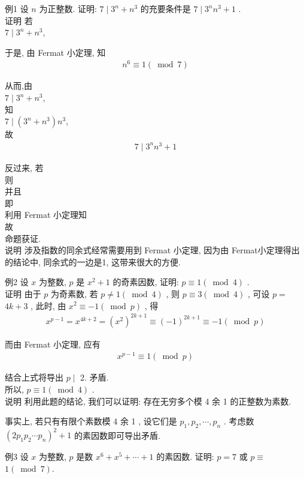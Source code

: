 	例1 设 $n$ 为正整数. 证明: $7 \mid 3^{n}+n^{3}$ 的充要条件是 $7 \mid 3^{n} n^{3}+1$ . \\
	证明 若\\
$7 \mid 3^{n}+n^{3}$,

	于是, 由 Fermat 小定理, 知
	\begin{align*}
		n^{6} \equiv 1(\bmod 7)
	\end{align*}

	从而,由\\
$7 \mid 3^{n}+n^{3}$,\\
	知\\
$7 \mid\left(3^{n}+n^{3}\right) n^{3}$,\\
	故
	\begin{align*}
		7 \mid 3^{n} n^{3}+1
	\end{align*}

	反过来, 若\\
	则\\
	并且\\
	即\\
	利用 Fermat 小定理知\\
	故\\
	命题获证.\\
	说明 涉及指数的同余式经常需要用到 Fermat 小定理, 因为由 Fermat小定理得出的结论中, 同余式的一边是1, 这带来很大的方便.

	例2 设 $x$ 为整数,  $p$ 是 $x^{2}+1$ 的奇素因数, 证明:  $p \equiv 1(\bmod 4)$ . \\
	证明 由于 $p$ 为奇素数, 若 $p \neq 1(\bmod 4)$ , 则 $p \equiv 3(\bmod 4)$ , 可设 $p=$ $4 k+3$ , 此时, 由 $x^{2} \equiv-1(\bmod p)$ , 得
	\begin{align*}
		x^{p-1}=x^{4 k+2}=\left(x^{2}\right)^{2 k+1} \equiv(-1)^{2 k+1} \equiv-1(\bmod p)
	\end{align*}

	而由 Fermat 小定理, 应有
	\begin{align*}
		x^{p-1} \equiv 1(\bmod p)
	\end{align*}

	结合上式将导出 $p \mid$ 2. 矛盾.\\
	所以,  $p \equiv 1(\bmod 4)$ . \\
	说明 利用此题的结论, 我们可以证明: 存在无穷多个模 4 余 1 的正整数为素数.

	事实上, 若只有有限个素数模 4 余 1 , 设它们是 $p_{1}, p_{2}, \cdots, p_{n}$ . 考虑数 $\left(2 p_{1} p_{2} \cdots p_{n}\right)^{2}+1$ 的素因数即可导出矛盾.

	例3 设 $x$ 为整数,  $p$ 是数 $x^{6}+x^{5}+\cdots+1$ 的素因数. 证明:  $p=7$ 或 $p \equiv$ $1(\bmod 7)$.

